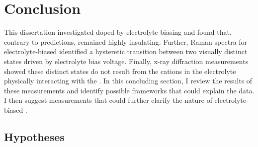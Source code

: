 \chapter{Conclusion}

This dissertation investigated \rucl doped by electrolyte biasing and found that, contrary to predictions, \rucl remained highly insulating. Further, Raman spectra for electrolyte-biased \rucl identified a hysteretic transition between two visually distinct states driven by electrolyte bias voltage. Finally, x-ray diffraction measurements showed these distinct states do not result from the cations in the electrolyte physically interacting with the \ruclnospace . In this concluding section, I review the results of these measurements and identify possible frameworks that could explain the data. I then suggest measurements that could further clarify the nature of electrolyte-biased \ruclnospace .

\section{Hypotheses}

